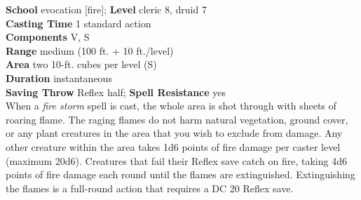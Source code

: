 \textbf{School }evocation [fire]; \textbf{Level }cleric 8, druid 7\\
\textbf{Casting Time }1 standard action\\
\textbf{Components }V, S\\
\textbf{Range }medium (100 ft. + 10 ft./level)\\
\textbf{Area }two 10-ft. cubes per level (S)\\
\textbf{Duration }instantaneous\\
\textbf{Saving Throw }Reflex half; \textbf{Spell Resistance }yes\\
When a \textit{fire storm }spell is cast, the whole area is shot through with sheets of roaring flame. The raging flames do not harm natural vegetation, ground cover, or any plant creatures in the area that you wish to exclude from damage. Any other creature within the area takes 1d6 points of fire damage per caster level (maximum 20d6). Creatures that fail their Reflex save catch on fire, taking 4d6 points of fire damage each round until the flames are extinguished. Extinguishing the flames is a full-round action that requires a DC 20 Reflex save.\\
